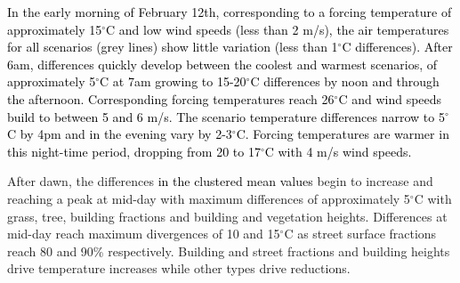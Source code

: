 \documentclass[final,3p,times,authoryear]{elsarticle}
\newcommand{\add}[1]{\textcolor{black}{#1}}
\newcommand{\remove}[1]{\textcolor{red}{\st{}}}
\begin{document}
\add{In the early morning of February 12th, corresponding to a forcing temperature of approximately 15$^{\circ}$C and low wind speeds (less than 2 m/s), the air temperatures for all scenarios (grey lines) show little variation (less than 1$^{\circ}$C differences). After 6am, differences quickly develop between the coolest and warmest scenarios, of approximately 5$^{\circ}$C at 7am growing to 15-20$^{\circ}$C differences by noon and through the afternoon. Corresponding forcing temperatures reach 26$^{\circ}$C and wind speeds build to between 5 and 6 m/s. The scenario temperature differences narrow  to 5$^{\circ}$C by 4pm and in the evening vary by 2-3$^{\circ}$C. Forcing temperatures are warmer in this night-time period, dropping from 20 to 17$^{\circ}$C with 4 m/s wind speeds.}




After dawn, the differences \add{in the clustered mean values} begin to increase and reaching a peak at mid-day with maximum differences of approximately 5$^{\circ}$C with grass, tree, building fractions and building and vegetation heights. Differences at mid-day reach maximum divergences of 10 and 15$^{\circ}$C as street surface fractions reach 80 and 90\% respectively. Building and street fractions and building heights drive temperature increases while other types drive reductions.
\end{document}
